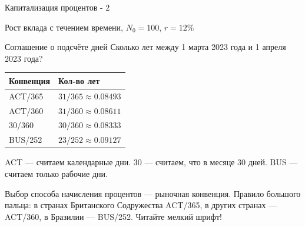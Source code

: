 \documentclass{beamer}
\begin{document}
\begin{frame}{Капитализация процентов - 2}

	\centering
	\scriptsize{Рост вклада с течением времени, $N_0=100$, $r=12\%$}
\end{frame}



\begin{frame}{Соглашение о подсчёте дней}
\justify
Сколько лет между 1 марта 2023 года и 1 апреля 2023 года?

\centering
\begin{tabular}{l|l}
Конвенция & Кол-во лет \\ \hline
ACT/365 & $31/365 \approx 0.08493$ \\
ACT/360 & $31/360 \approx 0.08611$ \\
30/360  & $30/360 \approx 0.08333$ \\
BUS/252 & $23/252 \approx 0.09127$ 
\end{tabular}

\justify
ACT --- считаем календарные дни. 30 --- считаем, что в месяце 30 дней. BUS --- считаем только рабочие дни.

\justify
Выбор способа начисления процентов --- рыночная конвенция. Правило большого пальца: в странах Британского Содружества ACT/365, в других странах --- ACT/360, в Бразилии --- BUS/252. Читайте мелкий шрифт! 
\end{frame}
\end{document}

